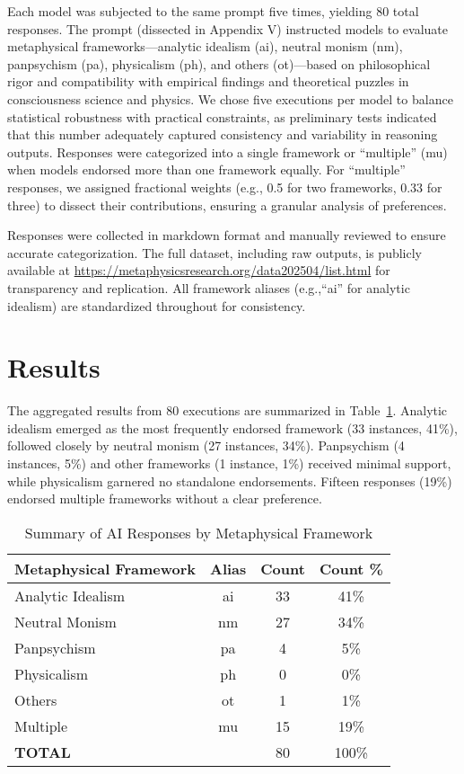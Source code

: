 \documentclass[11pt]{article}
\begin{document}
Each model was subjected to the same prompt five times, yielding 80 total responses. The prompt (dissected in Appendix V) instructed models to evaluate metaphysical frameworks—analytic idealism (ai), neutral monism (nm), panpsychism (pa), physicalism (ph), and others (ot)—based on philosophical rigor and compatibility with empirical findings and theoretical puzzles in consciousness science and physics. We chose five executions per model to balance statistical robustness with practical constraints, as preliminary tests indicated that this number adequately captured consistency and variability in reasoning outputs. Responses were categorized into a single framework or ``multiple'' (mu) when models endorsed more than one framework equally. For ``multiple'' responses, we assigned fractional weights (e.g., 0.5 for two frameworks, 0.33 for three) to dissect their contributions, ensuring a granular analysis of preferences.

Responses were collected in markdown format and manually reviewed to ensure accurate categorization. The full dataset, including raw outputs, is publicly available at \url{https://metaphysicsresearch.org/data202504/list.html} for transparency and replication. All framework aliases (e.g.,``ai'' for analytic idealism) are standardized throughout for consistency.

\section{Results}
The aggregated results from 80 executions are summarized in Table~\ref{tab:summary}. Analytic idealism emerged as the most frequently endorsed framework (33 instances, 41\%), followed closely by neutral monism (27 instances, 34\%). Panpsychism (4 instances, 5\%) and other frameworks (1 instance, 1\%) received minimal support, while physicalism garnered no standalone endorsements. Fifteen responses (19\%) endorsed multiple frameworks without a clear preference.

\begin{table}[ht!]
\centering
\caption{Summary of AI Responses by Metaphysical Framework}
\label{tab:summary}
\begin{tabular}{lccc}
\toprule
\textbf{Metaphysical Framework} & \textbf{Alias} & \textbf{Count} & \textbf{Count \%} \\
\midrule
Analytic Idealism & ai & 33 & 41\% \\
Neutral Monism    & nm & 27 & 34\% \\
Panpsychism       & pa & 4  & 5\%  \\
Physicalism       & ph & 0  & 0\%  \\
Others            & ot & 1  & 1\%  \\
Multiple          & mu & 15 & 19\% \\
\midrule
\textbf{TOTAL}    &    & 80 & 100\% \\
\bottomrule
\end{tabular}
\end{table}
\end{document}
